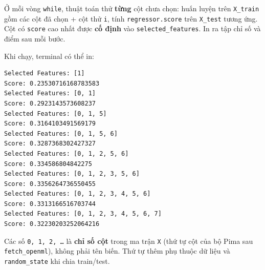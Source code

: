 \begin{ynghia}[title={Cách đọc vòng lặp}]
Ở mỗi vòng \texttt{while}, thuật toán thử \textbf{từng} cột chưa chọn: huấn luyện trên \texttt{X\_train} gồm các cột đã chọn + cột thử \texttt{i}, tính \texttt{regressor.score} trên \texttt{X\_test} tương ứng. Cột có \texttt{score} cao nhất được \textbf{cố định} vào \texttt{selected\_features}. In ra tập chỉ số và điểm sau mỗi bước.
\end{ynghia}

\begin{vidu}[title={Kết quả chạy (mẫu)}]
Khi chạy, terminal có thể in:
\begin{lstlisting}
Selected Features: [1]
Score: 0.23530716168783583
Selected Features: [0, 1]
Score: 0.2923143573608237
Selected Features: [0, 1, 5]
Score: 0.3164103491569179
Selected Features: [0, 1, 5, 6]
Score: 0.3287368302427327
Selected Features: [0, 1, 2, 5, 6]
Score: 0.334586804842275
Selected Features: [0, 1, 2, 3, 5, 6]
Score: 0.3356264736550455
Selected Features: [0, 1, 2, 3, 4, 5, 6]
Score: 0.3313166516703744
Selected Features: [0, 1, 2, 3, 4, 5, 6, 7]
Score: 0.32230203252064216
\end{lstlisting}
\end{vidu}

\begin{luuy}[title={Chỉ số đặc trưng}]
Các số \texttt{0, 1, 2, \ldots} là \textbf{chỉ số cột} trong ma trận \texttt{X} (thứ tự cột của bộ Pima sau \texttt{fetch\_openml}), không phải tên biến. Thứ tự thêm phụ thuộc dữ liệu và \texttt{random\_state} khi chia train/test.
\end{luuy}
